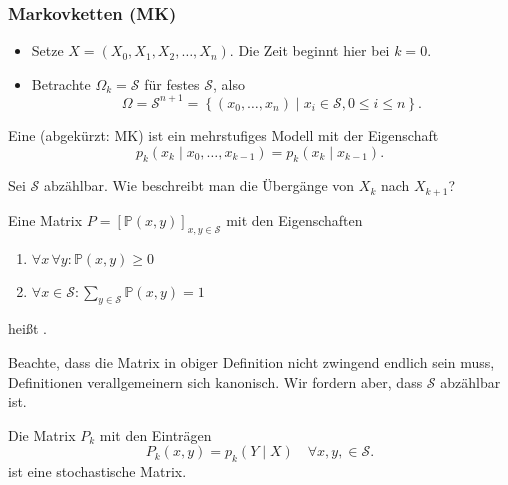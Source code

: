 \subsubsection{Markovketten (MK)}
\begin{itemize}
    \item Setze $X = (X_0,X_1,X_2,\ldots,X_n)$. Die Zeit beginnt hier bei $k=0$.
    \item Betrachte  $\Omega_k = \mathcal{S}$ für festes $\mathcal{S}$, also
        \[
            \Omega = \mathcal{S}^{n+1} = \left \{(x_0,\ldots,x_n) \mid  x_i \in \mathcal{S}, 0\leq i\leq n\right\} 
        .\] 
\end{itemize}

\begin{definition}[Markovkette]\label{def:markovkette}
    Eine  (abgekürzt: MK) ist ein mehrstufiges Modell mit der Eigenschaft
    \[
        p_k(x_k \mid  x_0,\ldots,x_{k-1}) = p_k (x_k\mid x_{k-1})
    .\] 
\end{definition}

\begin{question}
    Sei $\mathcal{S}$ abzählbar. Wie beschreibt man die Übergänge von $X_k$ nach  $X_{k+1}$?
\end{question}

\begin{definition}\label{def:stochastische-matrix}
    Eine Matrix $P = [\mathbb{P}(x,y)]_{x,y\in \mathcal{S}}$ mit den Eigenschaften
    \begin{enumerate}[label=\protect\circled{\alph*}]
        \item $\forall x\, \forall y \colon\mathbb{P}(x,y) \geq  0$
        \item $\forall x\in \mathcal{S}\colon\sum_{y\in \mathcal{S}} \mathbb{P}(x,y) = 1$
    \end{enumerate}
    heißt . 
\end{definition}

\begin{remark*}
    Beachte, dass die Matrix in obiger Definition nicht zwingend endlich sein muss, Definitionen verallgemeinern sich kanonisch. Wir fordern aber, dass $\mathcal{S}$ abzählbar ist.
\end{remark*}

\begin{lemma}\label{lm:übergangsmatrix-ist-stochastische-matrix}
    Die Matrix $P_k$ mit den Einträgen
    \[
        P_k(x,y) = p_k(Y \mid X) \quad \forall x,y,\in \mathcal{S}
    .\] 
    ist eine stochastische Matrix.
\end{lemma}

